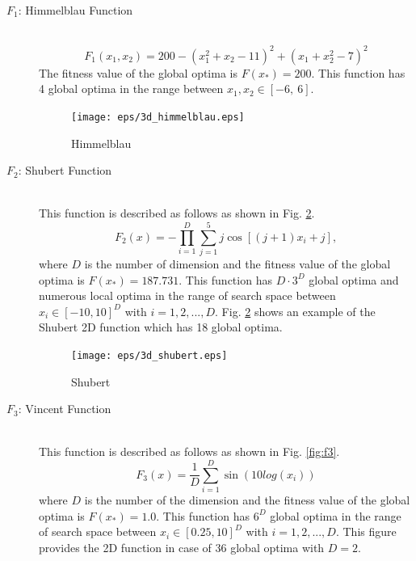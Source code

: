 \documentclass[conference]{IEEEtran}
\begin{document}
\begin{description}
\item[$F_1$: Himmelblau Function]\mbox{}\\
\begin{equation}
\label{eq:himmelblau}
F_1(x_1,x_2)=200-(x_1^2+x_2-11)^2+(x_1+x_2^2-7)^2
\end{equation}
The fitness value of the global optima is ${F(x_*)}=200$. This function has 4 global optima in the range between $x_1, x_2 \in [-6, \ 6]$.

\begin{figure}[h]
\begin{center}
	\texttt{[image: eps/3d\_himmelblau.eps]}
\caption{Himmelblau}
\label{fig:f1}
\end{center}
\end{figure}

\item[$F_2$: Shubert Function]\mbox{}\\
 This function is described as follows as shown in Fig. \ref{fig:f2}.
 \begin{equation}
F_2(x) = -\prod_{i=1}^D \sum_{j=1}^5 j \cos[(j+1)x_i+j], 
\end{equation}
where $D$ is the number of dimension and the fitness value of the global optima is ${F(x_*)=187.731}$. This function has  $D \cdot 3^D $ global optima and numerous local optima in the range of search space between $x_i \in [-10, 10]^D$ with $i=1,2,...,D$. Fig. \ref{fig:f2} shows an example of the Shubert 2D function which has 18 global optima. 

\begin{figure}[h]
\begin{center}
	\texttt{[image: eps/3d\_shubert.eps]}
\caption{Shubert}
\label{fig:f2}
\end{center}
\end{figure}

\item[$F_3$: Vincent Function]\mbox{}\\
 This function is described as follows as shown in Fig. \ref{fig:f3}.
 \begin{equation}
F_3(x) = \frac{1}{D} \sum_{i=1}^D \sin(10log(x_i)) 
\end{equation}
where $D$ is the number of the dimension and the fitness value of the global optima is ${F(x_*)=1.0}$. This function has $6^D $ global optima in the range of search space between $x_i \in [0.25, 10]^D$ with $i=1,2,...,D$. This figure provides the 2D function in case of 36 global optima with $D=2$. 


\end{description}
\end{document}
